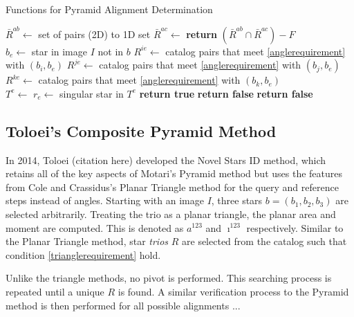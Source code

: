 \begin{algorithm}
\caption{Functions for Pyramid Alignment Determination} \label{Pyramid Helpers}
\begin{algorithmic}[1]
\State $\bar{R}^{ab} \gets $  \Comment set of pairs (2D) to 1D set
\State $\bar{R}^{ac} \gets $ 
\State \textbf{return} $(\bar{R}^{ab} \cap \bar{R}^{ac}) - F$
\EndFunction
\\
\State $b_e \gets $ star in image $I$ not in $b$
\State $R^{ie} \gets$ catalog pairs that meet \eqref{anglerequirement} with $(b_i, b_e)$
\State $R^{je} \gets$ catalog pairs that meet \eqref{anglerequirement} with $(b_j, b_e)$
\State $R^{ke} \gets$ catalog pairs that meet \eqref{anglerequirement} with $(b_k, b_e)$
\\
\State $T^e \gets $ 
\State $r_e \gets $ singular star in $T^e$
\State \textbf{return true}
\Else
\State \textbf{return false}
\EndIf
\Else
\State \textbf{return false}
\EndIf
\EndFunction
\end{algorithmic}
\end{algorithm}

\subsection{Toloei's Composite Pyramid Method}
In 2014, Toloei (citation here) developed the Novel Stars ID method, which retains all of the key aspects of Motari's Pyramid method but uses the features from Cole and Crassidus's Planar Triangle method for the query and reference steps instead of angles. Starting with an image $I$, three stars $b = (b_1, b_2, b_3)$ are selected arbitrarily. Treating the trio as a planar triangle, the planar area and moment are computed. This is denoted as $a^{123}$ and $\imath^{123}$ respectively. Similar to the Planar Triangle method, star \textit{trios} $R$ are selected from the catalog such that condition \eqref{trianglerequirement} hold.

Unlike the triangle methods, no pivot is performed. This searching process is repeated until a unique $R$ is found. A similar verification process to the Pyramid method is then performed for all possible alignments ...

